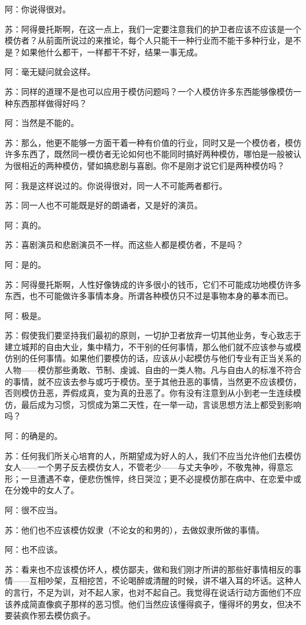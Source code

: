 \documentclass[12pt,oneside]{book}
\begin{document}
阿：你说得很对。

苏：阿得曼托斯啊，在这一点上，我们一定要注意我们的护卫者应该不应该是一个模仿者？从前面所说过的来推论，每个人只能干一种行业而不能干多种行业，是不是？如果他什么都干，一样都干不好，结果一事无成。

阿：毫无疑问就会这样。

苏：同样的道理不是也可以应用于模仿问题吗？一个人模仿许多东西能够像模仿一种东西那样做得好吗？

阿：当然是不能的。

苏：那么，他更不能够一方面干着一种有价值的行业，同时又是一个模仿者，模仿许多东西了，既然同一模仿者无论如何也不能同时搞好两种模仿，哪怕是一般被认为很相近的两种模仿，譬如搞悲剧与喜剧。你不是刚才说它们是两种模仿吗？

阿：我是这样说过的。你说得很对，同一人不可能两者都行。

苏：同一人也不可能既是好的朗诵者，又是好的演员。

阿：真的。

苏：喜剧演员和悲剧演员不一样。而这些人都是模仿者，不是吗？

阿：是的。

苏：阿得曼托斯啊，人性好像铸成的许多很小的钱币，它们不可能成功地模仿许多东西，也不可能做许多事情本身。所谓各种模仿只不过是事物本身的摹本而已。

阿：极是。

苏：假使我们要坚持我们最初的原则，一切护卫者放弃一切其他业务，专心致志于建立城邦的自由大业，集中精力，不干别的任何事情，那么他们就不应该参与或模仿别的任何事情。如果他们要模仿的话，应该从小起模仿与他们专业有正当关系的人物——模仿那些勇敢、节制、虔诚、自由的一类人物。凡与自由人的标准不符合的事情，就不应该去参与或巧于模仿。至于其他丑恶的事情，当然更不应该模仿，否则模仿丑恶，弄假成真，变为真的丑恶了。你有没有注意到从小到老一生连续模仿，最后成为习惯，习惯成为第二天性，在一举一动，言谈思想方法上都受到影响吗？

阿：的确是的。

苏：任何我们所关心培育的人，所期望成为好人的人，我们不应当允许他们去模仿女人——一个男子反去模仿女人，不管老少——与丈夫争吵，不敬鬼神，得意忘形；一旦遭遇不幸，便悲伤憔悴，终日哭泣；更不必提模仿那在病中、在恋爱中或在分娩中的女人了。

阿：很不应当。

苏：他们也不应该模仿奴隶（不论女的和男的），去做奴隶所做的事情。

阿：也不应该。

苏：看来也不应该模仿坏人，模仿鄙夫，做和我们刚才所讲的那些好事情相反的事情——互相吵架，互相挖苦，不论喝醉或清醒的时候，讲不堪入耳的坏话。这种人的言行，不足为训，对不起人家，也对不起自己。我觉得在说话行动方面他们不应该养成简直像疯子那样的恶习惯。他们当然应该懂得疯子，懂得坏的男女，但决不要装疯作邪去模仿疯子。
\end{document}
